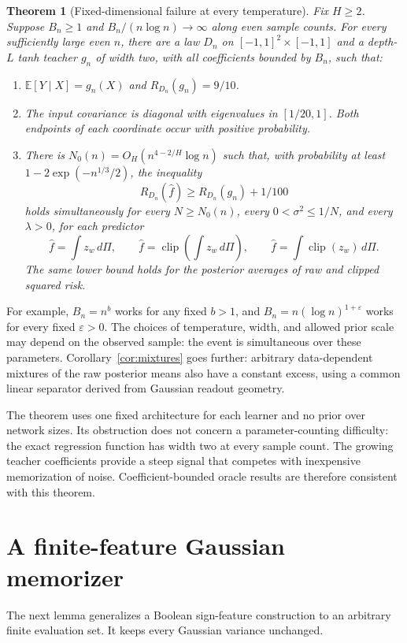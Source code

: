 \documentclass[11pt]{article}
\newtheorem{theorem}{Theorem}[section]
\newcommand{\E}{\mathbb E}\newcommand{\Pp}{\mathbb P}\newcommand{\R}{\mathbb R}
\newcommand{\clip}{\operatorname{clip}}\newcommand{\KL}{\operatorname{KL}}
\begin{document}
\begin{theorem}[Fixed-dimensional failure at every temperature]
\label{thm:main}
Fix $H\ge2$. Suppose $B_n\ge1$ and $B_n/(n\log n)\to\infty$ along even sample counts. For every sufficiently large even $n$, there are a law $D_n$ on $[-1,1]^2\times[-1,1]$ and a depth-$L$ tanh teacher $g_n$ of width two, with all coefficients bounded by $B_n$, such that:
\begin{enumerate}
 \item $\E[Y\mid X]=g_n(X)$ and $R_{D_n}(g_n)=9/10$.
 \item The input covariance is diagonal with eigenvalues in $[1/20,1]$. Both endpoints of each coordinate occur with positive probability.
 \item There is $N_0(n)=O_H(n^{4-2/H}\log n)$ such that, with probability at least $1-2\exp(-n^{1/3}/2)$, the inequality
 \[
 R_{D_n}(\widehat f)\ge R_{D_n}(g_n)+1/100
 \]
 holds simultaneously for every $N\ge N_0(n)$, every $0<\sigma^2\le1/N$, and every $\lambda>0$, for each predictor
 \[
 \widehat f=\int z_w\,d\Pi,\qquad
 \widehat f=\clip\left(\int z_w\,d\Pi\right),\qquad
 \widehat f=\int\clip(z_w)\,d\Pi.
 \]
 The same lower bound holds for the posterior averages of raw and clipped squared risk.
\end{enumerate}
\end{theorem}

For example, $B_n=n^b$ works for any fixed $b>1$, and $B_n=n(\log n)^{1+\varepsilon}$ works for every fixed $\varepsilon>0$. The choices of temperature, width, and allowed prior scale may depend on the observed sample: the event is simultaneous over these parameters. Corollary~\ref{cor:mixtures} goes further: arbitrary data-dependent mixtures of the raw posterior means also have a constant excess, using a common linear separator derived from Gaussian readout geometry.

The theorem uses one fixed architecture for each learner and no prior over network sizes. Its obstruction does not concern a parameter-counting difficulty: the exact regression function has width two at every sample count. The growing teacher coefficients provide a steep signal that competes with inexpensive memorization of noise. Coefficient-bounded oracle results are therefore consistent with this theorem.

\section{A finite-feature Gaussian memorizer}
The next lemma generalizes a Boolean sign-feature construction to an arbitrary finite evaluation set. It keeps every Gaussian variance unchanged.
\end{document}
